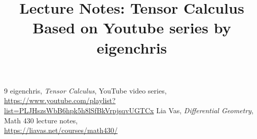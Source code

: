 \documentclass[12pt]{article}
\title{Lecture Notes: Tensor Calculus\\
\large Based on Youtube series by eigenchris}
\author{}
\date{}
\begin{document}
\maketitle
\tableofcontents
\newpage












\begin{thebibliography}{9}
eigenchris, \textit{Tensor Calculus}, YouTube video series,\\
\url{https://www.youtube.com/playlist?list=PLJHszsWbB6hpk5h8lSfBkVrpjsqvUGTCx}
Lia Vas, \textit{Differential Geometry}, Math 430 lecture notes,\\
\url{https://liavas.net/courses/math430/}
\end{thebibliography}
\end{document}
